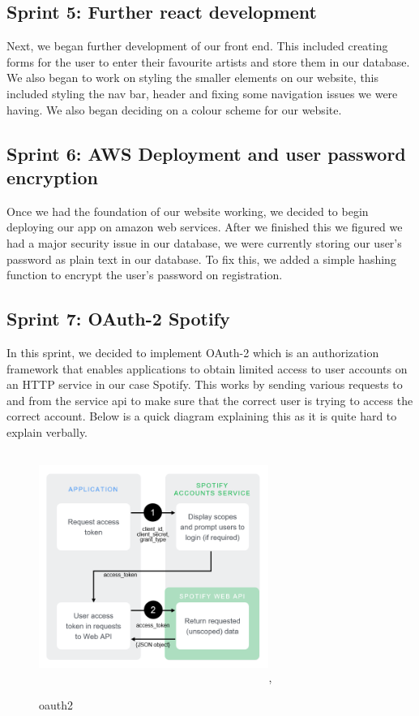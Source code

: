 \subsection{Sprint 5: Further react development}
Next, we began further development of our front end. This included creating forms for the user to enter their favourite artists and store them in our database. We also began to work on styling the smaller elements on our website, this included styling the nav bar, header and fixing some navigation issues we were having. We also began deciding on a colour scheme for our website. 

\subsection{Sprint 6: AWS Deployment and user password encryption}
Once we had the foundation of our website working, we decided to begin deploying our app on amazon web services. After we finished this we figured we had a major security issue in our database, we were currently storing our user’s password as plain text in our database. To fix this, we added a simple hashing function to encrypt the user’s password on registration.

\subsection{Sprint 7: OAuth-2 Spotify}
In this sprint, we decided to implement OAuth-2 which is an authorization framework that enables applications to obtain limited access to user accounts on an HTTP service in our case Spotify. This works by sending various requests to and from the service api to make sure that the correct user is trying to access the correct account. Below is a quick diagram explaining this as it is quite hard to explain verbally.

\begin{figure}[ht]
\renewcommand\thefigure{3.5}
\centering
\includegraphics[width=7.5cm, height=7.5cm]{img/oauth.png},
\caption{oauth2}
\label{oauth2}
\end{figure}


